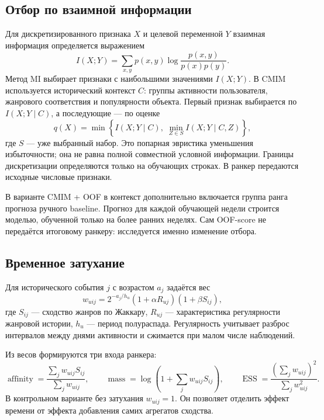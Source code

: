 \documentclass[12pt,a4paper]{article}
\begin{document}
\subsection{Отбор по взаимной информации}
Для дискретизированного признака $X$ и целевой переменной $Y$ взаимная
информация определяется выражением
\begin{equation}
I(X;Y)=\sum_{x,y}p(x,y)\log\frac{p(x,y)}{p(x)p(y)}.
\end{equation}
Метод MI выбирает признаки с наибольшими значениями $I(X;Y)$.
В CMIM используется исторический контекст $C$: группы активности
пользователя, жанрового соответствия и популярности объекта.
Первый признак выбирается по $I(X;Y\mid C)$, а последующие — по оценке
\begin{equation}
q(X)=\min\left\{I(X;Y\mid C),\;\min_{Z\in S}I(X;Y\mid C,Z)\right\},
\end{equation}
где $S$ — уже выбранный набор. Это попарная эвристика уменьшения
избыточности; она не равна полной совместной условной информации.
Границы дискретизации определяются только на обучающих строках.
В ранкер передаются исходные числовые признаки.

В варианте CMIM + OOF в контекст дополнительно включается группа ранга
прогноза ручного baseline. Прогноз для каждой обучающей недели строится
моделью, обученной только на более ранних неделях. Сам OOF-score не
передаётся итоговому ранкеру: исследуется именно изменение отбора.

\subsection{Временное затухание}
Для исторического события $j$ с возрастом $a_j$ задаётся вес
\begin{equation}
w_{uij}=2^{-a_j/h_u}(1+\alpha R_{uj})(1+\beta S_{ij}),
\end{equation}
где $S_{ij}$ — сходство жанров по Жаккару, $R_{uj}$ — характеристика
регулярности жанровой истории, $h_u$ — период полураспада.
Регулярность учитывает разброс интервалов между днями активности и
сжимается при малом числе наблюдений.

Из весов формируются три входа ранкера:
\begin{equation}
\operatorname{affinity}=\frac{\sum_j w_{uij}S_{ij}}{\sum_jw_{uij}},\qquad
\operatorname{mass}=\log\left(1+\sum_jw_{uij}S_{ij}\right),\qquad
\operatorname{ESS}=\frac{(\sum_jw_{uij})^2}{\sum_jw_{uij}^2}.
\end{equation}
В контрольном варианте без затухания $w_{uij}=1$. Он позволяет отделить
эффект времени от эффекта добавления самих агрегатов сходства.
\end{document}
